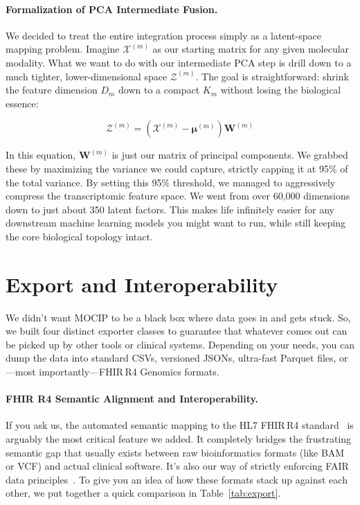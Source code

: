 \documentclass[12pt,a4paper,onecolumn]{article}
\begin{document}
\paragraph{Formalization of PCA Intermediate Fusion.}
We decided to treat the entire integration process simply as a latent-space mapping problem. Imagine $\mathcal{X}^{(m)}$ as our starting matrix for any given molecular modality. What we want to do with our intermediate PCA step is drill down to a much tighter, lower-dimensional space $\mathcal{Z}^{(m)}$. The goal is straightforward: shrink the feature dimension $D_m$ down to a compact $K_m$ without losing the biological essence:

\begin{equation}
\mathcal{Z}^{(m)} = (\mathcal{X}^{(m)} - \mathbf{\mu}^{(m)}) \mathbf{W}^{(m)}
\end{equation}

In this equation, $\mathbf{W}^{(m)}$ is just our matrix of principal components. We grabbed these by maximizing the variance we could capture, strictly capping it at 95\% of the total variance. By setting this 95\% threshold, we managed to aggressively compress the transcriptomic feature space. We went from over 60,000 dimensions down to just about 350 latent factors. This makes life infinitely easier for any downstream machine learning models you might want to run, while still keeping the core biological topology intact.

\section{Export and Interoperability}

We didn't want MOCIP to be a black box where data goes in and gets stuck. So, we built four distinct exporter classes to guarantee that whatever comes out can be picked up by other tools or clinical systems. Depending on your needs, you can dump the data into standard CSVs, versioned JSONs, ultra-fast Parquet files, or---most importantly---FHIR\,R4 Genomics formats.

\paragraph{FHIR R4 Semantic Alignment and Interoperability.}
If you ask us, the automated semantic mapping to the HL7 FHIR\,R4 standard~\cite{hl7fhir} is arguably the most critical feature we added. It completely bridges the frustrating semantic gap that usually exists between raw bioinformatics formats (like BAM or VCF) and actual clinical software. It's also our way of strictly enforcing FAIR data principles~\cite{wilkinson2016}. To give you an idea of how these formats stack up against each other, we put together a quick comparison in Table~\ref{tab:export}.
\end{document}
